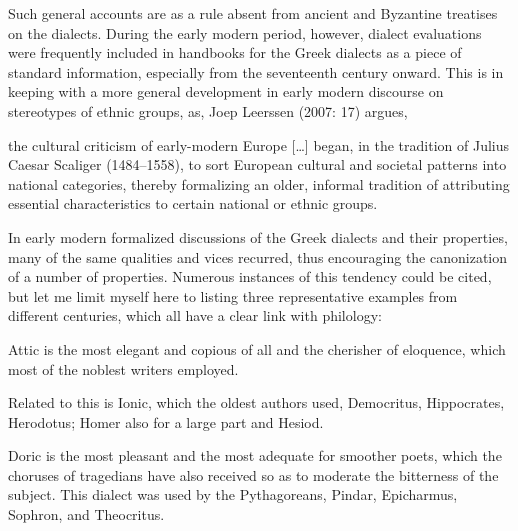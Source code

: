 \begin{styleQuote}
\varsigma $ $\rho \chi \alpha \iota o\tau \rho {}\pi {}$”.}
\end{styleQuote}

\begin{styleStandard}
Such general accounts are as a rule absent from ancient and Byzantine treatises on the dialects. During the early modern period, however, dialect evaluations were frequently included in handbooks for the Greek dialects as a piece of standard information, especially from the seventeenth century onward. This is in keeping with a more general development in early modern discourse on stereotypes of ethnic groups, as, Joep Leerssen (2007: 17) argues,
\end{styleStandard}

\begin{styleQuote}
the cultural criticism of early-modern Europe […] began, in the tradition of Julius Caesar Scaliger (1484–1558), to sort European cultural and societal patterns into national categories, thereby formalizing an older, informal tradition of attributing essential characteristics to certain national or ethnic groups.
\end{styleQuote}

\begin{styleStandard}
In early modern formalized discussions of the Greek dialects and their properties, many of the same qualities and vices recurred, thus encouraging the canonization of a number of properties. Numerous instances of this tendency could be cited, but let me limit myself here to listing three representative examples from different centuries, which all have a clear link with philology:
\end{styleStandard}

\begin{styleQuote}
Attic is the most elegant and copious of all and the cherisher of eloquence, which most of the noblest writers employed.
\end{styleQuote}

\begin{styleQuote}
Related to this is Ionic, which the oldest authors used, Democritus, Hippocrates, Herodotus; Homer also for a large part and Hesiod.
\end{styleQuote}

\begin{styleQuote}
Doric is the most pleasant and the most adequate for smoother poets, which the choruses of tragedians have also received so as to moderate the bitterness of the subject. This dialect was used by the Pythagoreans, Pindar, Epicharmus, Sophron, and Theocritus.
\end{styleQuote}

